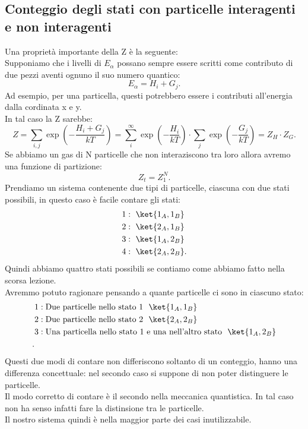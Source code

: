 \subsection{Conteggio degli stati con particelle interagenti e non interagenti}%
Una proprietà importante della Z è la seguente:\\
Supponiamo che i livelli di $E_{\alpha}$ possano sempre essere scritti come contributo di due pezzi aventi ognuno il suo numero quantico:
\[
	E_{\alpha} = H_{i}+ G_{j}
.\] 
Ad esempio, per una particella, questi potrebbero essere i contributi all'energia dalla cordinata x e y.\\
In tal caso la Z sarebbe:
\[
	Z = \sum_{i,j}^{} \exp\left( -\frac{H_{i}+G_{j}}{kT} \right) = \sum_{i}^{\infty} \exp\left( - \frac{H_{i}}{kT} \right) \cdot \sum_{j}^{} \exp\left( -\frac{G_{j}}{kT} \right) = Z_{H}\cdot Z_{G}
.\] 
Se abbiamo un gas di N particelle che non interaziscono tra loro allora avremo una funzione di partizione:
\[
	Z_{t} = Z_1^{N}
.\] 
Prendiamo un sistema contenente due tipi di particelle, ciascuna con due stati possibili, in questo caso è facile contare gli stati:
\begin{align}
	&1: \ \ket{1_{A},1_{B}}\\
	&2: \ \ket{2_{A},1_{B}}\\
	&3: \ \ket{1_{A},2_{B}}\\
	&4: \ \ket{2_{A},2_{B}}
.\end{align}
Quindi abbiamo quattro stati possibili se contiamo come abbiamo fatto nella scorsa lezione.\\
Avremmo potuto ragionare pensando a quante particelle ci sono in ciascuno stato:
\begin{align}
	&1: \text{Due particelle nello stato 1 } \ \ket{1_{A},1_{B}}\\
	&2: \text{Due particelle nello stato 2 } \ \ket{2_{A},2_{B}}\\
	&3: \text{Una particella nello stato 1 e una nell'altro stato  } \ \ket{1_{A},2_{B}}\\
.\end{align}
Questi due modi di contare non differiscono soltanto di un conteggio, hanno una differenza concettuale: nel secondo caso si suppone di non poter distinguere le particelle.\\
Il modo corretto di contare è il secondo nella meccanica quantistica. In tal caso non ha senso infatti fare la distinsione tra le particelle.\\
Il nostro sistema quindi è nella maggior parte dei casi inutilizzabile.\\
